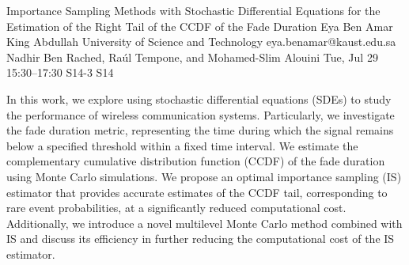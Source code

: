 \begin{talk}
  {Importance Sampling Methods with Stochastic Differential Equations for the Estimation of the Right Tail of the CCDF of the Fade Duration}%
  {Eya Ben Amar}%
  {King Abdullah University of Science and Technology}%
  {eya.benamar@kaust.edu.sa}%
  {Nadhir Ben Rached, Ra\'ul Tempone, and Mohamed-Slim Alouini}%
  {}%
  {Tue, Jul 29 15:30–17:30}%
  {S14-3}%
  {S14}%
  
				
In this work, we explore using stochastic differential equations (SDEs) to study the performance of wireless communication systems. Particularly, we investigate the fade duration metric, representing the time during which the signal remains below a specified threshold within a fixed time interval. We estimate the complementary cumulative distribution function (CCDF) of the fade duration using Monte Carlo simulations. We propose an optimal importance sampling (IS) estimator that provides accurate estimates of the CCDF tail, corresponding to rare event probabilities, at a significantly reduced computational cost. Additionally, we introduce a novel multilevel Monte Carlo method combined with IS and discuss its efficiency in further reducing the computational cost of the IS estimator.
\medskip

\end{talk}

